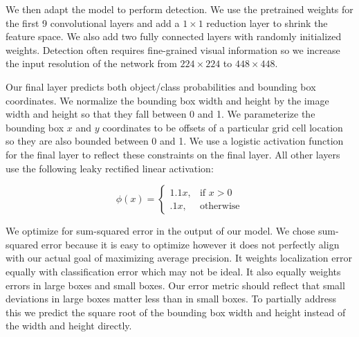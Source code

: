\documentclass{article} %
\begin{document}
We then adapt the model to perform detection. We use the pretrained weights for the first 9 convolutional layers and add a $1 \times 1$ reduction layer to shrink the feature space. We also add two fully connected layers with randomly initialized weights. Detection often requires fine-grained visual information so we increase the input resolution of the network from $224 \times 224$ to $448 \times 448$.

Our final layer predicts both object/class probabilities and bounding box coordinates. We normalize the bounding box width and height by the image width and height so that they fall between 0 and 1. We parameterize the bounding box $x$ and $y$ coordinates to be offsets of a particular grid cell location so they are also bounded between 0 and 1. We use a logistic activation function for the final layer to reflect these constraints on the final layer. All other layers use the following leaky rectified linear activation:

\begin{equation}
\phi(x) =
\begin{cases}
    1.1x, & \text{if } x > 0\\
    .1x, & \text{otherwise}
    \end{cases}
\end{equation}

We optimize for sum-squared error in the output of our model. We chose sum-squared error because it is easy to optimize however it does not perfectly align with our actual goal of maximizing average precision. It weights localization error equally with classification error which may not be ideal. It also equally weights errors in large boxes and small boxes. Our error metric should reflect that small deviations in large boxes matter less than in small boxes. To partially address this we predict the square root of the bounding box width and height instead of the width and height directly.
\end{document}
